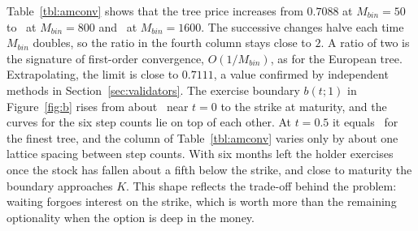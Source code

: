 Table~\ref{tbl:amconv} shows that the tree price increases from $0.7088$ at $M_{bin}=50$ to \AmVeight\ at $M_{bin}=800$ and \AmV\ at $M_{bin}=1600$.
The successive changes halve each time $M_{bin}$ doubles, so the ratio in the fourth column stays close to $2$.
A ratio of two is the signature of first-order convergence, $O(1/M_{bin})$, as for the European tree.
Extrapolating, the limit is close to $0.7111$, a value confirmed by independent methods in Section~\ref{sec:validators}.
The exercise boundary $b(t;1)$ in Figure~\ref{fig:b} rises from about \AmBearly\ near $t=0$ to the strike at maturity, and the curves for the six step counts lie on top of each other.
At $t=0.5$ it equals \AmBhalf\ for the finest tree, and the column of Table~\ref{tbl:amconv} varies only by about one lattice spacing between step counts.
With six months left the holder exercises once the stock has fallen about a fifth below the strike, and close to maturity the boundary approaches $K$.
This shape reflects the trade-off behind the problem: waiting forgoes interest on the strike, which is worth more than the remaining optionality when the option is deep in the money.
